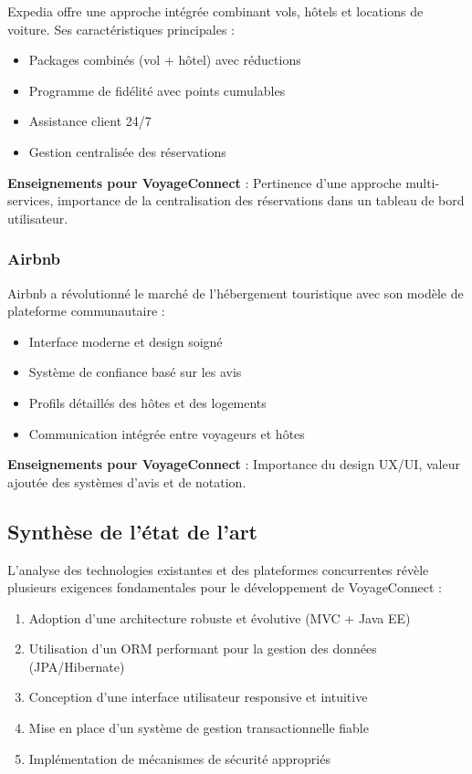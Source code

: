 \documentclass[12pt,a4paper]{report}
\begin{document}
Expedia offre une approche intégrée combinant vols, hôtels et locations de voiture. Ses caractéristiques principales :

\begin{itemize}
    \item Packages combinés (vol + hôtel) avec réductions
    \item Programme de fidélité avec points cumulables
    \item Assistance client 24/7
    \item Gestion centralisée des réservations
\end{itemize}

\textbf{Enseignements pour VoyageConnect} : Pertinence d'une approche multi-services, importance de la centralisation des réservations dans un tableau de bord utilisateur.

\subsubsection{Airbnb}

Airbnb a révolutionné le marché de l'hébergement touristique avec son modèle de plateforme communautaire :

\begin{itemize}
    \item Interface moderne et design soigné
    \item Système de confiance basé sur les avis
    \item Profils détaillés des hôtes et des logements
    \item Communication intégrée entre voyageurs et hôtes
\end{itemize}

\textbf{Enseignements pour VoyageConnect} : Importance du design UX/UI, valeur ajoutée des systèmes d'avis et de notation.

\subsection{Synthèse de l'état de l'art}

L'analyse des technologies existantes et des plateformes concurrentes révèle plusieurs exigences fondamentales pour le développement de VoyageConnect :

\begin{enumerate}
    \item Adoption d'une architecture robuste et évolutive (MVC + Java EE)
    \item Utilisation d'un ORM performant pour la gestion des données (JPA/Hibernate)
    \item Conception d'une interface utilisateur responsive et intuitive
    \item Mise en place d'un système de gestion transactionnelle fiable
    \item Implémentation de mécanismes de sécurité appropriés
\end{enumerate}
\end{document}
